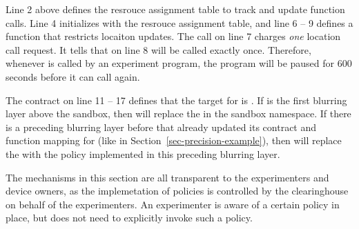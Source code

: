 Line 2 above defines the resrouce assignment table to track and update 
function calls. Line 4 initializes  with the resrouce assignment 
table, and line 6 -- 9 defines a 
function  that restricts locaiton updates. 
The  call on line 7 charges \textit{one} location call 
request. It tells  that  on line 8 will 
be called exactly once. Therefore, whenever  is 
called by an experiment program, the program will be paused for 600
seconds before it can call  again.

The contract on line 11 -- 17 defines that the target
for  is . If 
 is the first blurring layer above the sandbox, then
 will replace the 
in the sandbox namespace. If there is a preceding blurring layer 
before  that already updated its contract and 
function mapping for  (like   
in Section~\ref{sec-precision-example}), then
 will replace the  
with the policy implemented in this preceding blurring layer.

The mechanisms in this section are all transparent to the experimenters 
and device owners, as the implemetation of policies is controlled by the 
clearinghouse on behalf of the experimenters. An experimenter is aware 
of a certain policy in place, but does not need to explicitly invoke such a 
policy. 